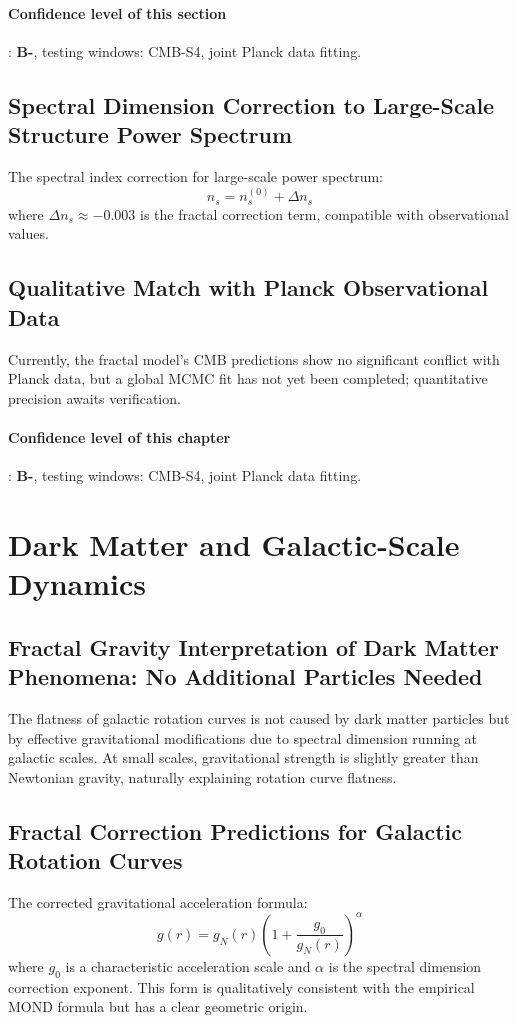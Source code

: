 \documentclass[12pt,a4paper,twocolumn]{article}
\begin{document}
\paragraph{Confidence level of this section}: \textbf{B-}, testing windows: CMB-S4, joint Planck data fitting.

\subsection{Spectral Dimension Correction to Large-Scale Structure Power Spectrum}
The spectral index correction for large-scale power spectrum:
\[
n_s = n_s^{(0)} + \Delta n_s
\]
where $\Delta n_s \approx -0.003$ is the fractal correction term, compatible with observational values.

\subsection{Qualitative Match with Planck Observational Data}
Currently, the fractal model's CMB predictions show no significant conflict with Planck data, but a global MCMC fit has not yet been completed; quantitative precision awaits verification.

\paragraph{Confidence level of this chapter}: \textbf{B-}, testing windows: CMB-S4, joint Planck data fitting.

\section{Dark Matter and Galactic-Scale Dynamics}

\subsection{Fractal Gravity Interpretation of Dark Matter Phenomena: No Additional Particles Needed}
The flatness of galactic rotation curves is not caused by dark matter particles but by effective gravitational modifications due to spectral dimension running at galactic scales. At small scales, gravitational strength is slightly greater than Newtonian gravity, naturally explaining rotation curve flatness.

\subsection{Fractal Correction Predictions for Galactic Rotation Curves}
The corrected gravitational acceleration formula:
\[
g(r) = g_N(r) \left( 1 + \frac{g_0}{g_N(r)} \right)^\alpha
\]
where $g_0$ is a characteristic acceleration scale and $\alpha$ is the spectral dimension correction exponent. This form is qualitatively consistent with the empirical MOND formula but has a clear geometric origin.
\end{document}
